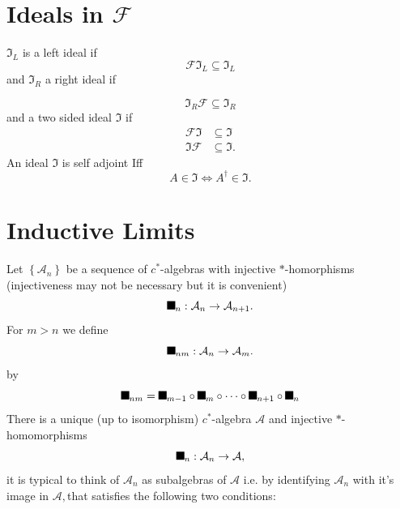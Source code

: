 \documentclass[aps,preprint]{revtex4}%
\providecommand{\U}[1]{\protect\rule{.1in}{.1in}}
\begin{document}
\section{Ideals in $\mathcal{F}$}

$\mathfrak{I}_{L}$ is a left ideal if
\begin{equation}
\mathcal{F}\mathfrak{I}_{L}\subseteq\mathfrak{I}_{L}%
\end{equation}
and $\mathfrak{I}_{R}$ a right ideal if %

\begin{equation}
\mathfrak{I}_{R}\mathcal{F}\subseteq\mathfrak{I}_{R}%
\end{equation}
and a two sided ideal $\mathfrak{I}$ if
\begin{align}
\mathcal{F}\mathfrak{I}  & \subseteq\mathfrak{I}\\
\mathfrak{I}\mathcal{F}  & \subseteq\mathfrak{I.}%
\end{align}
An ideal $\mathfrak{I}$ is self adjoint Iff
\begin{equation}
A\in\mathfrak{I\Leftrightarrow}A^{\dagger}\in\mathfrak{I.}%
\end{equation}


\section{Inductive Limits}

Let $\left\{  \mathcal{A}_{n}\right\}  $ be a sequence of $c^{\ast}$-algebras
with injective $\ast$-homorphisms (injectiveness may not be necessary but it
is convenient)
\begin{equation}
\U{3c0} _{n}:\mathcal{A}_{n}\rightarrow\mathcal{A}_{n+1}.
\end{equation}
For $m>n$ we define
\begin{equation}
\U{3c0} _{nm}:\mathcal{A}_{n}\rightarrow\mathcal{A}_{m}.
\end{equation}
by%
\begin{equation}
\U{3c0} _{nm}=\U{3c0} _{m-1}\circ\U{3c0} _{m}\circ\cdots\circ\U{3c0}
_{n+1}\circ\U{3c0} _{n}%
\end{equation}
There is a unique (up to isomorphism) $c^{\ast}$-algebra $\mathcal{A}$ and
injective $\ast$-homomorphisms%
\begin{equation}
\U{3c3} _{n}:\mathcal{A}_{n}\rightarrow\mathcal{A},
\end{equation}
it is typical to think of $\mathcal{A}_{n}$ as subalgebras of $\mathcal{A}$
i.e. by identifying $\mathcal{A}_{n}$ with it's image in $\mathcal{A},$that
satisfies the following two conditions:
\end{document}
